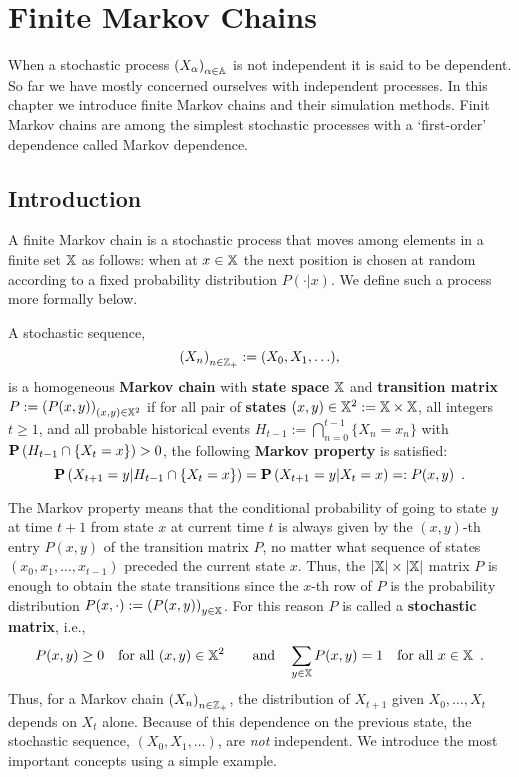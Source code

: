\chapter{Finite Markov Chains}

When a stochastic process $\left(X_{\alpha} \right)_{\alpha \in \mathbb{A}}$ is not independent it is said to be dependent.  
So far we have mostly concerned ourselves with independent processes.  
In this chapter we introduce finite Markov chains and their  simulation methods.
Finit Markov chains are among the simplest stochastic processes with a `first-order' dependence called Markov dependence.

\section{Introduction}\label{S:FiniteMCIntro}
A finite Markov chain is a stochastic process that moves among elements in a finite set $\mathbb{X}$ as follows: when at $x \in \mathbb{X}$ the next position is chosen at random according to a fixed probability distribution $P(\cdot | x)$.  We define such a process more formally below.

\begin{definition}\label{D:TimeHomFiniteMC}
A stochastic sequence, $$\left(X_n\right)_{n \in \mathbb{Z}_+} := (X_0,X_1,\ldots),$$ is a homogeneous {\bf Markov chain} with {\bf state space} $\mathbb{X}$ and {\bf transition matrix} $P:=\left(P(x,y)\right)_{(x,y)\in \mathbb{X}^2}$ if for all pair of {\bf states} ${(x,y)\in \mathbb{X}^2 := \mathbb{X} \times \mathbb{X}}$, all integers $t \geq 1$, and all probable historical events $H_{t-1} := \bigcap_{n=0}^{t-1} \{ X_n = x_n \}$ with $\mathbf{P} \left(H_{t-1} \cap \{X_t = x\} \right) > 0$, the following {\bf Markov property} is satisfied: 
\begin{equation}\label{E:FiniteMarkovProperty}
\mathbf{P}\left(X_{t+1} = y | H_{t-1} \cap \{X_t = x\} \right)=\mathbf{P}\left(X_{t+1} = y | X_t = x \right) =: P(x,y) \enspace .
\end{equation}
\end{definition}
The Markov property means that the conditional probability of going to state $y$ at time $t+1$ from state $x$ at current time $t$ is always given by the $(x,y)$-th entry $P(x,y)$ of the transition matrix $P$, no matter what sequence of states $(x_0,x_1,\ldots,x_{t-1})$ preceded the current state $x$.  Thus, the $|\mathbb{X}| \times |\mathbb{X}|$ matrix $P$ is enough to obtain the state transitions since the $x$-th row of $P$ is the probability distribution $P(x,\cdot) := \left( P(x,y) \right)_{y \in \mathbb{X}}$.  For this reason $P$ is called a {\bf stochastic matrix}, i.e.,
\begin{equation}\label{E:StochasticMatrixConds}
P(x,y) \geq 0 \quad \text{for all } (x,y) \in \mathbb{X}^2 \qquad \text{and} \quad \sum_{y \in \mathbb{X}} P(x,y) = 1 \quad \text{for all } x \in \mathbb{X} \enspace .
\end{equation}
Thus, for a Markov chain $\left(X_n\right)_{n \in \mathbb{Z}_+}$, the distribution of $X_{t+1}$ given $X_0,\ldots,X_t$  depends on $X_t$ alone. Because of this dependence on the previous state, the stochastic sequence, $(X_0,X_1,\ldots)$, are {\it not} independent.  We introduce the most important concepts using a simple example.

